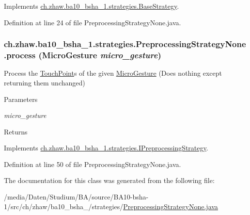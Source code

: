 Implements \hyperlink{classch_1_1zhaw_1_1ba10__bsha__1_1_1strategies_1_1BaseStrategy_af6ea27835befac71906915236a347450}{ch.zhaw.ba10\_\-bsha\_\-1.strategies.BaseStrategy}.

Definition at line 24 of file PreprocessingStrategyNone.java.\hypertarget{classch_1_1zhaw_1_1ba10__bsha__1_1_1strategies_1_1PreprocessingStrategyNone_ac69d173a141370d7fe5c3dd96021a558}{
\subsubsection[{process}]{ ch.zhaw.ba10\_\-bsha\_\-1.strategies.PreprocessingStrategyNone.process ({\bf MicroGesture} {\em micro\_\-gesture})}}
\label{classch_1_1zhaw_1_1ba10__bsha__1_1_1strategies_1_1PreprocessingStrategyNone_ac69d173a141370d7fe5c3dd96021a558}
Process the \hyperlink{classch_1_1zhaw_1_1ba10__bsha__1_1_1TouchPoint}{TouchPoint}s of the given \hyperlink{}{MicroGesture} (Does nothing except returning them unchanged)


\begin{DoxyParams}{Parameters}
\item[{\em micro\_\-gesture}]\end{DoxyParams}
\begin{DoxyReturn}{Returns}

\end{DoxyReturn}


Implements \hyperlink{interfacech_1_1zhaw_1_1ba10__bsha__1_1_1strategies_1_1IPreprocessingStrategy_a3e3885dce8fda7b79dc514078f11ad62}{ch.zhaw.ba10\_\-bsha\_\-1.strategies.IPreprocessingStrategy}.

Definition at line 50 of file PreprocessingStrategyNone.java.

The documentation for this class was generated from the following file:\begin{DoxyCompactItemize}
\item 
/media/Daten/Studium/BA/source/BA10-\/bsha-\/1/src/ch/zhaw/ba10\_\-bsha\_/strategies/\hyperlink{PreprocessingStrategyNone_8java}{PreprocessingStrategyNone.java}\end{DoxyCompactItemize}
